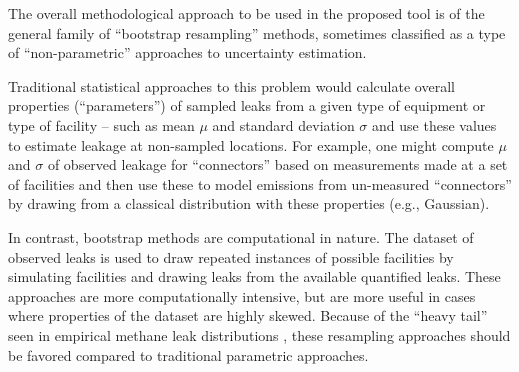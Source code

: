 \documentclass[11pt]{report}
\begin{document}
The overall methodological approach to be used in the proposed tool is of the general family of ``bootstrap resampling'' methods, sometimes classified as a type of ``non-parametric'' approaches to uncertainty estimation. 

Traditional statistical approaches to this problem would calculate overall properties (``parameters'') of sampled leaks from a given type of equipment or type of facility -- such as mean $\mu$ and standard deviation $\sigma$ and use these values to estimate leakage at non-sampled locations. For example, one might compute $\mu$ and $\sigma$ of observed leakage for ``connectors'' based on measurements made at a set of facilities and then use these to model emissions from un-measured ``connectors'' by drawing from a classical distribution with these properties (e.g., Gaussian).

In contrast, bootstrap methods are computational in nature. The dataset of observed leaks is used to draw repeated instances of possible facilities by simulating facilities and drawing leaks from the available quantified leaks. These approaches are more computationally intensive, but are more useful in cases where properties of the dataset are highly skewed. Because of the ``heavy tail'' seen in empirical methane leak distributions \cite{Brandt2016}, these resampling approaches should be favored compared to traditional parametric approaches.
\end{document}
